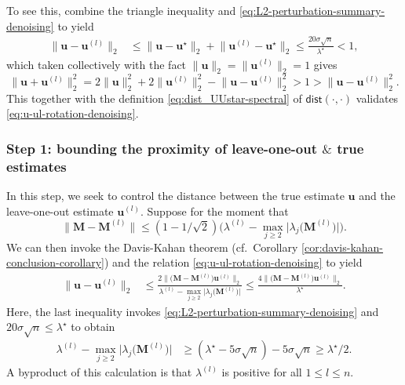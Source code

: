 To see this, combine the triangle inequality and \eqref{eq:L2-perturbation-summary-denoising} to yield
%
\begin{align*}
	\big\|\bm{u}-\bm{u}^{(l)}\big\|_{2} & \leq\big\|\bm{u}-\bm{u}^{\star}\big\|_{2}+\big\|\bm{u}^{(l)}-\bm{u}^{\star}\big\|_{2}
	\leq\frac{20\sigma\sqrt{n}}{\lambda^{\star}}<1 ,
\end{align*}
%
which taken collectively with the fact $\|\bm{u} \|_{2} = \|\bm{u}^{(l)}\|_{2}=1$ gives
%
\[
\big\|\bm{u}+\bm{u}^{(l)}\big\|_{2}^{2}=
2\big\|\bm{u}\big\|_{2}^{2}+2\big\|\bm{u}^{(l)}\big\|_{2}^2
-\big\|\bm{u}-\bm{u}^{(l)}\big\|_{2}^{2}>1>\big\|\bm{u}-\bm{u}^{(l)}\big\|_{2}^{2}.
\]
%
This together with the definition \eqref{eq:dist_UUstar-spectral} of $\mathsf{dist}(\cdot,\cdot)$ validates  \eqref{eq:u-ul-rotation-denoising}.



\subsubsection{Step 1: bounding the proximity of leave-one-out $\&$ true estimates}

In this step, we seek to control the distance between the true estimate $\bm{u}$ and the leave-one-out estimate $\bm{u}^{(l)}$. Suppose for the moment that
\begin{equation}\label{eq:noise-small-gap}
\|\bm{M}-\bm{M}^{(l)}\| \leq (1 - 1 / \sqrt{2}) \Big(\lambda^{(l)}-  \max_{j\geq 2}\big| \lambda_{j}\big(\bm{M}^{(l)}\big) \big| \Big).
\end{equation}
We can then invoke the Davis-Kahan theorem (cf.~Corollary \ref{cor:davis-kahan-conclusion-corollary}) and the relation \eqref{eq:u-ul-rotation-denoising} to yield
%
\begin{align}
	\big\|\bm{u}-\bm{u}^{(l)}\big\|_{2} &
	\leq\frac{2\|\big(\bm{M}-\bm{M}^{(l)}\big)\bm{u}^{(l)}\|_{2}}{\lambda^{(l)}- \max\limits_{j\geq 2}\big| \lambda_{j}\big(\bm{M}^{(l)}\big) \big| }
	\leq \frac{4\|\big(\bm{M}-\bm{M}^{(l)}\big)\bm{u}^{(l)}\|_{2}}{\lambda^{\star}}.
	\label{eq:u-ul-diff-denoising}
\end{align}
%
Here, the last inequality invokes \eqref{eq:L2-perturbation-summary-denoising} and $20\sigma\sqrt{n}\leq \lambda^{\star}$ to obtain
%
\begin{align}
	\lambda^{(l)}-  \max_{j\geq 2}\big| \lambda_{j}\big(\bm{M}^{(l)}\big) \big| & \geq  (\lambda^{\star}-  5\sigma \sqrt{n} ) - 5\sigma \sqrt{n} \geq\lambda^{\star}/2 .
	\label{eq:lambda-l-minus-lambda-j-LB1}
\end{align}
A byproduct of this calculation is that $\lambda^{(l)}$ is positive for all $1\leq l \leq n$.
%

